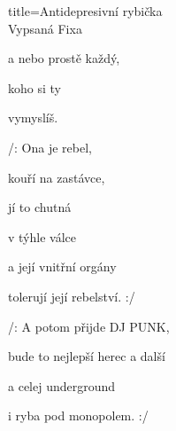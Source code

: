 \begin{song}{title=\predtitle \centering Antidepresivní rybička \\\large Vypsaná Fixa   \vspace*{-0.3cm}}
\begin{centerjustified}
\begin{varwidth}[t]{0.48\textwidth}
  a nebo prostě každý, 

  koho si ty 

  vymyslíš.

 /:  Ona je rebel, 
  
  kouří na zastávce,

  jí to chutná  

  v týhle válce 

  a její vnitřní orgány

  tolerují její rebelství. :/

\sloka 
  /: A potom přijde DJ PUNK,

  bude to nejlepší herec a další 

  a celej underground 

  i ryba pod monopolem. :/


\end{varwidth}
\end{centerjustified}
\setcounter{Slokočet}{0}
\end{song}

